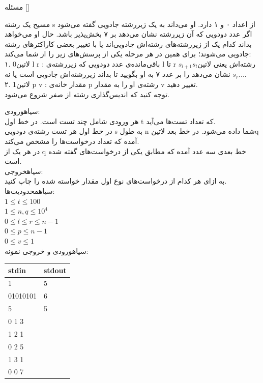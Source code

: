 

‌مسئله []

مسیح یک رشته s از اعداد ۰ و ۱ دارد. او می‌داند به یک زیررشته جادویی گفته می‌شود اگر عدد دودویی که آن زیررشته نشان می‌دهد بر ۷ بخش‌پذیر باشد. حال او می‌خواهد بداند کدام یک از زیررشته‌های رشته‌اش جادویی‌اند یا با تغییر بعضی کاراکترهای رشته جادویی می‌شوند؛ برای همین در هر مرحله یکی از پرسش‌های زیر را از شما می‌کند: \\
۱. ‌لاتین{0 l r} : باقی‌مانده‌ی عدد دودویی که زیررشته‌ی l تا r رشته‌اش یعنی ‌لاتین{$s_l$$s_{l+1}$...$s_r$} ‌ نشان می‌دهد
 را بر عدد ۷ به او بگویید تا بداند زیررشته‌اش جادویی است یا نه.\\
۲. ‌لاتین{1 p v } : مقدار خانه‌ی p رشته‌ی او را به مقدار v تغییر دهید.\\
توجه کنید که اندیس‌گذاری رشته از صفر شروع می‌شود. 

‌سیاه{ورودی:}\\
هر ورودی شامل چند تست است. در خط اول t که تعداد تست‌ها می‌آید.\\
در خط اول هر تست رشته‌ی دودویی s به طول n شما داده می‌شود. در خط بعد  ‌لاتین{q} آمده که تعداد درخواست‌ها را مشخص می‌کند.\\ 
در هر یک از q خط بعدی سه عدد آمده که مطابق یکی از درخواست‌های گفته شده است.\\


‌سیاه{خروجی:}\\
به ازای هر کدام از درخواست‌های نوع اول مقدار خواسته شده را چاپ کنید.\\

‌سیاه{محدودیت‌ها:}\\
$1 \leq t \leq 100$\\
$1 \leq n, q \leq 10^{4}$\\
$0 \leq l \leq r \leq n - 1$\\
$0 \leq p \leq n - 1$\\
$0 \leq v \leq 1$\\

‌سیاه{ورودی و خروجی نمونه:}\\

\begin{latin}
	\begin{tabularx}{\textwidth}{|X | X|}
		\hline
		\textbf{stdin} &
		\textbf{stdout}\\
		\hline
		1 & 5\\
		01010101 & 6\\
		5 & 5\\
		0 1 3 &\\
		1 2 1 & \\
		0 2 5&\\
		1 3 1&\\
		0 0 7&\\
		\hline
	\end{tabularx}
\end{latin}

